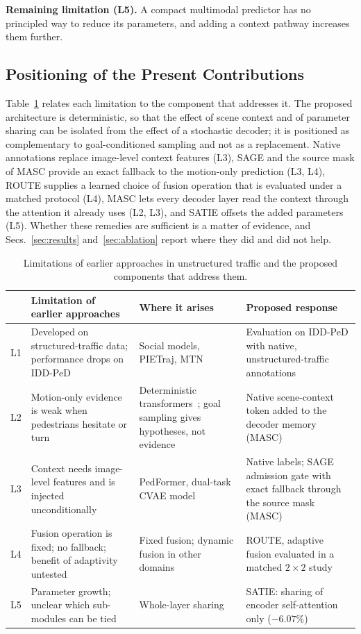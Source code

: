\textbf{Remaining limitation (L5).} A compact multimodal predictor has no principled way to reduce its parameters, and adding a context pathway increases them further.

\subsection{Positioning of the Present Contributions}
Table~\ref{tab:gaps} relates each limitation to the component that addresses it. The proposed architecture is deterministic, so that the effect of scene context and of parameter sharing can be isolated from the effect of a stochastic decoder; it is positioned as complementary to goal-conditioned sampling and not as a replacement. Native annotations replace image-level context features (L3), SAGE and the source mask of MASC provide an exact fallback to the motion-only prediction (L3, L4), ROUTE supplies a learned choice of fusion operation that is evaluated under a matched protocol (L4), MASC lets every decoder layer read the context through the attention it already uses (L2, L3), and SATIE offsets the added parameters (L5). Whether these remedies are sufficient is a matter of evidence, and Secs.~\ref{sec:results} and~\ref{sec:ablation} report where they did and did not help.

\begin{table}[t]
\centering
\caption{Limitations of earlier approaches in unstructured traffic and the proposed components that address them.}
\label{tab:gaps}
\scriptsize
\begin{tabular}{p{0.3cm}p{4.9cm}p{4.4cm}p{5.5cm}}
\toprule
 & Limitation of earlier approaches & Where it arises & Proposed response\\
\midrule
L1 & Developed on structured-traffic data; performance drops on IDD-PeD & Social models, PIETraj, MTN~\citep{iddped2025} & Evaluation on IDD-PeD with native, unstructured-traffic annotations\\
L2 & Motion-only evidence is weak when pedestrians hesitate or turn & Deterministic transformers~\citep{yin2021mtn}; goal sampling gives hypotheses, not evidence & Native scene-context token added to the decoder memory (MASC)\\
L3 & Context needs image-level features and is injected unconditionally & PedFormer, dual-task CVAE model~\citep{rasouli2022pedformer,sharma2025dual} & Native labels; SAGE admission gate with exact fallback through the source mask (MASC)\\
L4 & Fusion operation is fixed; no fallback; benefit of adaptivity untested & Fixed fusion; dynamic fusion in other domains~\citep{xue2022dynmm} & ROUTE, adaptive fusion evaluated in a matched $2{\times}2$ study\\
L5 & Parameter growth; unclear which sub-modules can be tied & Whole-layer sharing~\citep{dehghani2019universal,lan2020albert} & SATIE: sharing of encoder self-attention only ($-6.07\%$)\\
\bottomrule
\end{tabular}
\end{table}
